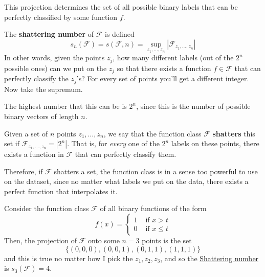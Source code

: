  This projection determines the set of all possible binary labels that can be perfectly classified by some function $f$. 

  \begin{definition}
    \label{def:shattering-number}
    The \textbf{shattering number} of $\mathcal{F}$ is defined 
    \begin{equation}
      s_n (\mathcal{F}) = s(\mathcal{F}, n) = \sup_{z_1, \ldots, z_n} |\mathcal{F}_{z_1, \ldots, z_n}|
    \end{equation}
    In other words, given the points $z_j$, how many different labels (out of the $2^n$ possible ones) can we put on the $z_j$ so that there exists a function $f \in \mathcal{F}$ that can perfectly classify the $z_j$'s? For every set of points you'll get a different integer. Now take the supremum. 
  \end{definition}

  The highest number that this can be is $2^n$, since this is the number of possible binary vectors of length $n$. 

  \begin{definition}
    \label{def:shattering-a-set}
    Given a set of $n$ points $z_1, \ldots, z_n$, we say that the function class $\mathcal{F}$ \textbf{shatters} this set if $\mathcal{F}_{z_1, \ldots, z_n} = |2^n|$. That is, for \textit{every} one of the $2^n$ labels on these points, there exists a function in $\mathcal{F}$ that can perfectly classify them. 
  \end{definition}

  Therefore, if $\mathcal{F}$ shatters a set, the function class is in a sense too powerful to use on the dataset, since no matter what labels we put on the data, there exists a perfect function that interpolates it. 

  \begin{example}
    \label{ex:binary-functions}
    Consider the function class $\mathcal{F}$ of all binary functions of the form 
    \begin{equation}
      f(x) = \begin{cases} 1 & \text{ if } x > t \\
        0 & \text{ if } x \leq t \end{cases} 
    \end{equation}
    Then, the projection of $\mathcal{F}$ onto some $n = 3$ points is the set 
    \begin{equation}
      \{ (0, 0, 0), (0, 0, 1), (0, 1, 1), (1, 1, 1) \}
    \end{equation}
    and this is true no matter how I pick the $z_1, z_2, z_3$, and so the \hyperref[def:shattering-number]{Shattering number} is $s_3 (\mathcal{F}) = 4$. 
  \end{example}

